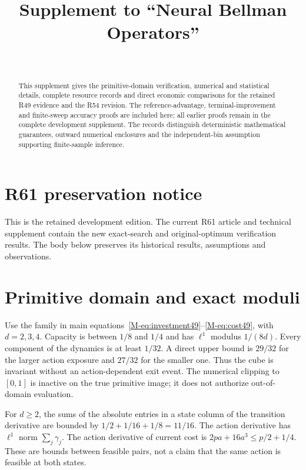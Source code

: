 \documentclass[ecta,nameyear,draft]{econsocart}
\begin{document}
\begin{frontmatter}
\title{Supplement to ``Neural Bellman Operators''}
\begin{aug}\author[id=au1,addressref={add1}]{~}\address[id=add1]{Peking University}\end{aug}
\begin{abstract}
This supplement gives the primitive-domain verification, numerical and statistical details, complete resource records and direct economic comparisons for the retained R49 evidence and the R54 revision. The reference-advantage, terminal-improvement and finite-sweep accuracy proofs are included here; all earlier proofs remain in the complete development supplement. The records distinguish deterministic mathematical guarantees, outward numerical enclosures and the independent-bin assumption supporting finite-sample inference.
\end{abstract}\end{frontmatter}
\section*{R61 preservation notice}
This is the retained development edition. The current R61 article and technical supplement contain the new exact-search and original-optimum verification results. The body below preserves its historical results, assumptions and observations.

\section{Primitive domain and exact moduli}\label{supp:primitive49}
Use the family in main equations~\eqref{M-eq:investment49}--\eqref{M-eq:cost49}, with $d=2,3,4$. Capacity is between $1/8$ and $1/4$ and has $\ell^1$ modulus $1/(8d)$. Every component of the dynamics is at least $1/32$. A direct upper bound is $29/32$ for the larger action exposure and $27/32$ for the smaller one. Thus the cube is invariant without an action-dependent exit event. The numerical clipping to $[0,1]$ is inactive on the true primitive image; it does not authorize out-of-domain evaluation.

For $d\ge2$, the sums of the absolute entries in a state column of the transition derivative are bounded by $1/2+1/16+1/8=11/16$. The action derivative has $\ell^1$ norm $\sum_j\gamma_j$. The action derivative of current cost is $2pa+16a^3\le p/2+1/4$. These are bounds between feasible pairs, not a claim that the same action is feasible at both states.
\end{document}
